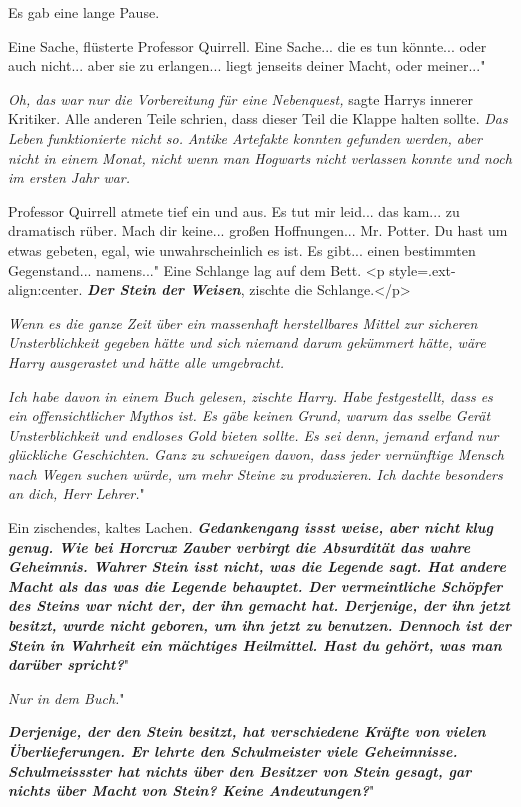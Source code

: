 Es gab eine lange Pause.

\glqq Eine Sache\grqq{}, flüsterte Professor Quirrell. \glqq Eine Sache... die
es tun könnte... oder auch nicht... aber sie zu erlangen... liegt jenseits
deiner Macht, oder meiner..."

\emph{Oh, das war nur die Vorbereitung für eine Nebenquest,} sagte Harrys
innerer Kritiker. Alle anderen Teile schrien, dass dieser Teil die Klappe halten
sollte. \emph{Das Leben funktionierte nicht so.} \emph{Antike Artefakte konnten
gefunden werden, aber nicht in einem Monat, nicht wenn man Hogwarts nicht
verlassen konnte und noch im ersten Jahr war.}

Professor Quirrell atmete tief ein und aus. \glqq Es tut mir leid... das kam...
zu dramatisch rüber. Mach dir keine... großen Hoffnungen... Mr. Potter. Du hast
um etwas gebeten, egal, wie unwahrscheinlich es ist. Es gibt... einen bestimmten
Gegenstand... namens..." Eine Schlange lag auf dem Bett. <p
style=\grqq{}.ext-align:center\grqq{}. \glqq \textbf{\emph{Der Stein der
Weisen}}\grqq{}, zischte die Schlange.</p>

\emph{Wenn es die ganze Zeit über ein massenhaft herstellbares Mittel zur sicheren Unsterblichkeit gegeben hätte und sich niemand darum gekümmert hätte, wäre Harry ausgerastet und hätte alle umgebracht.}

\glqq \emph{Ich habe davon in einem Buch gelesen\grqq{}, zischte Harry. \glqq
Habe festgestellt, dass es ein offensichtlicher Mythos ist. Es gäbe keinen
Grund, warum das sselbe Gerät Unsterblichkeit und endloses Gold bieten sollte.
Es sei denn, jemand erfand nur glückliche Geschichten. Ganz zu schweigen davon,
dass jeder vernünftige Mensch nach Wegen suchen würde, um mehr Steine zu
produzieren. Ich dachte besonders an dich, Herr Lehrer.}"

Ein zischendes, kaltes Lachen. \glqq \textbf{\emph{Gedankengang issst weise,
aber nicht klug genug. Wie bei Horcrux Zauber verbirgt die Absurdität das wahre
Geheimnis. Wahrer Stein isst nicht, was die Legende sagt. Hat andere Macht als
das was die Legende behauptet. Der vermeintliche Schöpfer des Steins war nicht
der, der ihn gemacht hat. Derjenige, der ihn jetzt besitzt, wurde nicht geboren,
um ihn jetzt zu benutzen. Dennoch ist der Stein in Wahrheit ein mächtiges
Heilmittel. Hast du gehört, was man darüber spricht?}}"

\glqq \emph{Nur in dem Buch.}"

\glqq \textbf{\emph{Derjenige, der den Stein besitzt, hat verschiedene Kräfte
von vielen Überlieferungen. Er lehrte den Schulmeister viele Geheimnisse.
Schulmeissster hat nichts über den Besitzer von Stein gesagt, gar nichts über
Macht von Stein? Keine Andeutungen?}}"

